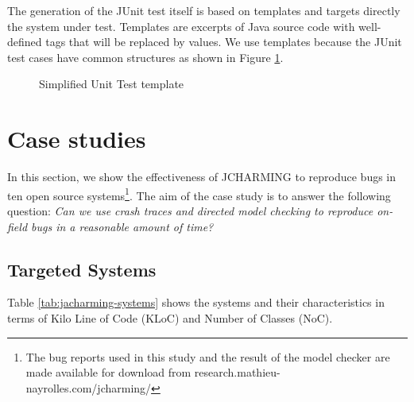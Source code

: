 \documentclass[times]{smrauth}
\begin{document}
The generation of the JUnit test itself is based on templates and targets directly the system under test. Templates are excerpts of Java source code with well-defined tags that will be replaced by values. We use templates because the JUnit test cases have common structures as shown in Figure \ref{fig:jcharming-unittemplate}.

\begin{figure}[h!]

\noindent\fbox{%
    \parbox{\textwidth}{%
    
}%
}

    \caption{Simplified Unit Test template
    \label{fig:jcharming-unittemplate}}
\end{figure}


\section{Case studies\label{sec:cases}}

In this section, we show the effectiveness of JCHARMING to
reproduce bugs in ten open source systems\footnote{The bug reports used in this study and the result of the model checker are
made available for download from research.mathieu-
nayrolles.com/jcharming/}. The aim of the
case study is to answer the following question: {\it Can we use
crash traces and directed model checking to reproduce on-
field bugs in a reasonable amount of time?}

\subsection{Targeted Systems}

Table \ref{tab:jacharming-systems} shows the systems and their characteristics in terms of
Kilo Line of Code (KLoC) and Number of Classes (NoC).
\end{document}
